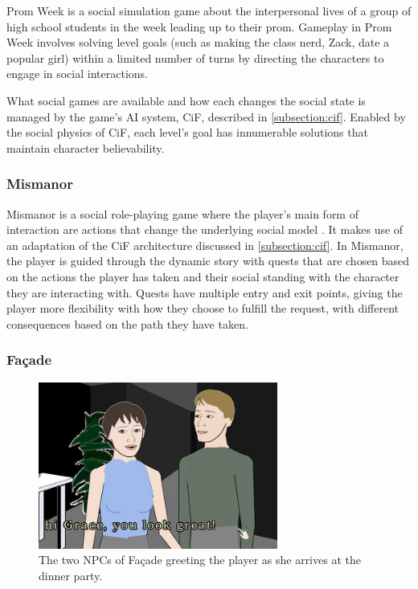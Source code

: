 \noindent Prom Week is a social simulation game about the interpersonal lives of a group of high school students in the  week leading up to their prom\cite{mccoy:prom-week}.
Gameplay in Prom Week involves solving level goals (such as making the class nerd, Zack, date a popular girl) within a limited number of turns by directing the characters to engage in social interactions.

What social games are available and how each changes the social state is managed by the game's \ac{AI} system, \ac{CiF}, described in \ref{subsection:cif}.
Enabled by the social physics of \ac{CiF}, each level's goal has innumerable solutions that maintain character believability.

\subsubsection*{Mismanor}

\noindent Mismanor is a social role-playing game where the player’s main form of interaction are actions that change the underlying social model \cite{sullivan:mismanor}.
It makes use of an adaptation of the \ac{CiF} architecture discussed in \ref{subsection:cif}.
In Mismanor, the player is guided through the dynamic story with quests that are chosen based on the actions the player has taken and their social standing with the character they are interacting with.
Quests have multiple entry and exit points, giving the player more flexibility with how they choose to fulfill the request, with different consequences based on the path they have taken.

\subsubsection*{Façade}

\begin{figure}
  \centering
  \includegraphics[width=0.7\textwidth]{./Images/facade-screenshot}
  \caption{The two NPCs of Façade greeting the player as she arrives at the dinner party.}
  \label{fig:facade}
\end{figure}

